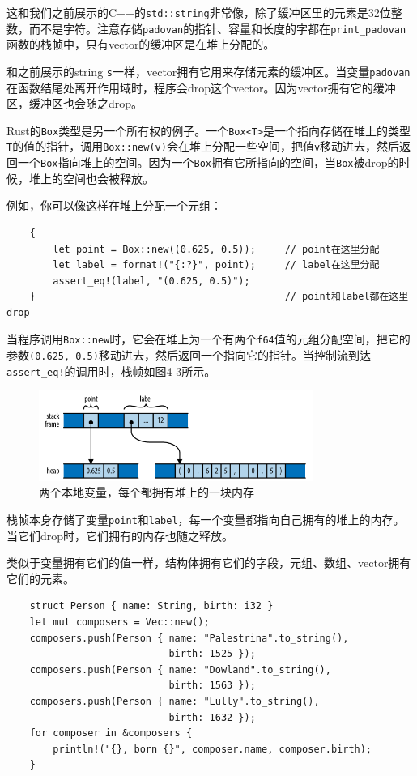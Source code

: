 这和我们之前展示的C++的\texttt{std::string}非常像，除了缓冲区里的元素是32位整数，而不是字符。注意存储\texttt{padovan}的指针、容量和长度的字都在\texttt{print\_padovan}函数的栈帧中，只有vector的缓冲区是在堆上分配的。

和之前展示的string \texttt{s}一样，vector拥有它用来存储元素的缓冲区。当变量\texttt{padovan}在函数结尾处离开作用域时，程序会drop这个vector。因为vector拥有它的缓冲区，缓冲区也会随之drop。

Rust的\texttt{Box}类型是另一个所有权的例子。一个\texttt{Box<T>}是一个指向存储在堆上的类型\texttt{T}的值的指针，调用\texttt{Box::new(v)}会在堆上分配一些空间，把值\texttt{v}移动进去，然后返回一个\texttt{Box}指向堆上的空间。因为一个\texttt{Box}拥有它所指向的空间，当\texttt{Box}被drop的时候，堆上的空间也会被释放。

例如，你可以像这样在堆上分配一个元组：
\begin{verbatim}
    {
        let point = Box::new((0.625, 0.5));     // point在这里分配
        let label = format!("{:?}", point);     // label在这里分配
        assert_eq!(label, "(0.625, 0.5)");
    }                                           // point和label都在这里drop
\end{verbatim}

当程序调用\texttt{Box::new}时，它会在堆上为一个有两个\texttt{f64}值的元组分配空间，把它的参数\texttt{(0.625, 0.5)}移动进去，然后返回一个指向它的指针。当控制流到达\texttt{assert\_eq!}的调用时，栈帧如\hyperref[f4-3]{图4-3}所示。

\begin{figure}[htbp]
    \centering
    \includegraphics[width=0.8\textwidth]{../img/f4-3.png}
    \caption{两个本地变量，每个都拥有堆上的一块内存}
    \label{f4-3}
\end{figure}

栈帧本身存储了变量\texttt{point}和\texttt{label}，每一个变量都指向自己拥有的堆上的内存。当它们drop时，它们拥有的内存也随之释放。

类似于变量拥有它们的值一样，结构体拥有它们的字段，元组、数组、vector拥有它们的元素。

\begin{verbatim}
    struct Person { name: String, birth: i32 }
    let mut composers = Vec::new();
    composers.push(Person { name: "Palestrina".to_string(),
                            birth: 1525 });
    composers.push(Person { name: "Dowland".to_string(),
                            birth: 1563 });
    composers.push(Person { name: "Lully".to_string(),
                            birth: 1632 });
    for composer in &composers {
        println!("{}, born {}", composer.name, composer.birth);
    }
\end{verbatim}


